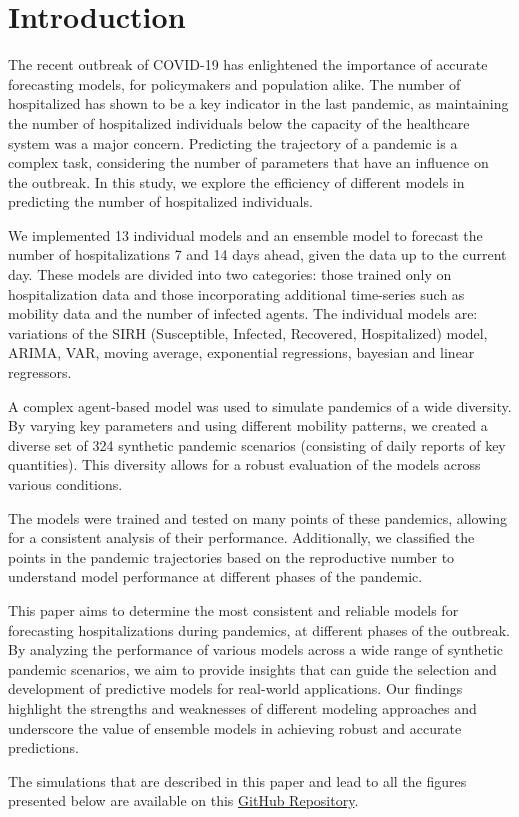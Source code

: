\section{Introduction}

The recent outbreak of COVID-19 has enlightened the importance of accurate forecasting models, for policymakers and population alike. 
The number of hospitalized has shown to be a key indicator in the last pandemic, as maintaining the number of hospitalized individuals below the capacity of the healthcare system was a major concern.
Predicting the trajectory of a pandemic is a complex task, considering the number of parameters that have an influence on the outbreak. 
In this study, we explore the efficiency of different models in predicting the number of hospitalized individuals. 

We implemented 13 individual models and an ensemble model to forecast the number of hospitalizations 7 and 14 days ahead, given the data up to the current day.
These models are divided into two categories: those trained only on hospitalization data and those incorporating additional time-series such as mobility data and the number of infected agents. 
The individual models are: variations of the SIRH (Susceptible, Infected, Recovered, Hospitalized) model, ARIMA, VAR, moving average, exponential regressions, bayesian and linear regressors.

A complex agent-based model was used to simulate pandemics of a wide diversity. 
By varying key parameters and using different mobility patterns, we created a diverse set of 324 synthetic pandemic scenarios (consisting of daily reports of key quantities). 
This diversity allows for a robust evaluation of the models across various conditions.

The models were trained and tested on many points of these pandemics, allowing for a consistent analysis of their performance. 
Additionally, we classified the points in the pandemic trajectories based on the reproductive number to understand model performance at different phases of the pandemic.

This paper aims to determine the most consistent and reliable models for forecasting hospitalizations during pandemics, at different phases of the outbreak. 
By analyzing the performance of various models across a wide range of synthetic pandemic scenarios, we aim to provide insights that can guide the selection and development of predictive models for real-world applications. 
Our findings highlight the strengths and weaknesses of different modeling approaches and underscore the value of ensemble models in achieving robust and accurate predictions.

The simulations that are described in this paper and lead to all the figures presented below are available on this  \href{https://github.com/gregoirebechade/covid_internship}{GitHub Repository}\label{github-link}.
